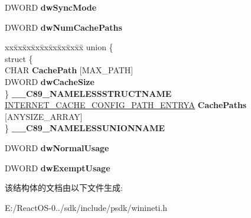 \begin{DoxyCompactItemize}
D\+W\+O\+RD {\bfseries dw\+Sync\+Mode}
\item 
\mbox{\label{struct___i_n_t_e_r_n_e_t___c_a_c_h_e___c_o_n_f_i_g___i_n_f_o_a_a7e506775cba8c4b802535cc36e9ad001}} 
D\+W\+O\+RD {\bfseries dw\+Num\+Cache\+Paths}
\item 
\mbox{\label{struct___i_n_t_e_r_n_e_t___c_a_c_h_e___c_o_n_f_i_g___i_n_f_o_a_a5e1ef05974c045e6ff7df9f52a3421a6}} 
\begin{tabbing}
xx\=xx\=xx\=xx\=xx\=xx\=xx\=xx\=xx\=\kill
union \{\\
\>struct \{\\
\>\>CHAR {\bfseries CachePath} \mbox{[}MAX\_PATH\mbox{]}\\
\>\>DWORD {\bfseries dwCacheSize}\\
\>\} {\bfseries \_\_C89\_NAMELESSSTRUCTNAME}\\
\>\hyperlink{struct___i_n_t_e_r_n_e_t___c_a_c_h_e___c_o_n_f_i_g___p_a_t_h___e_n_t_r_y_a}{INTERNET\_CACHE\_CONFIG\_PATH\_ENTRYA} {\bfseries CachePaths} \mbox{[}ANYSIZE\_ARRAY\mbox{]}\\
\} {\bfseries \_\_C89\_NAMELESSUNIONNAME}\\

\end{tabbing}\item 
\mbox{\label{struct___i_n_t_e_r_n_e_t___c_a_c_h_e___c_o_n_f_i_g___i_n_f_o_a_aeafd906bd1ae419fc3ab688b302515de}} 
D\+W\+O\+RD {\bfseries dw\+Normal\+Usage}
\item 
\mbox{\label{struct___i_n_t_e_r_n_e_t___c_a_c_h_e___c_o_n_f_i_g___i_n_f_o_a_a0d50b93de2c6d3bbaa279979bd2a82ed}} 
D\+W\+O\+RD {\bfseries dw\+Exempt\+Usage}
\end{DoxyCompactItemize}


该结构体的文档由以下文件生成\+:\begin{DoxyCompactItemize}
\item 
E\+:/\+React\+O\+S-\/0../sdk/include/psdk/winineti.\+h\end{DoxyCompactItemize}

